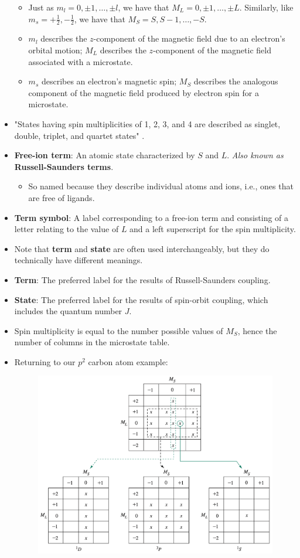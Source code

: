 \documentclass[../notes.tex]{subfiles}
\begin{document}
\begin{itemize}
\begin{itemize}
        \item Just as $m_l=0,\pm 1,\dots,\pm l$, we have that $M_L=0,\pm 1,\dots,\pm L$. Similarly, like $m_s=+\frac{1}{2},-\frac{1}{2}$, we have that $M_S=S,S-1,\dots,-S$.
        \item $m_l$ describes the $z$-component of the magnetic field due to an electron's orbital motion; $M_L$ describes the $z$-component of the magnetic field associated with a microstate.
        \item $m_s$ describes an electron's magnetic spin; $M_S$ describes the analogous component of the magnetic field produced by electron spin for a microstate.
    \end{itemize}
    \item "States having spin multiplicities of 1, 2, 3, and 4 are described as singlet, double, triplet, and quartet states" \parencite[408]{bib:MiesslerFischerTarr}.
    \item \textbf{Free-ion term}: An atomic state characterized by $S$ and $L$. \emph{Also known as} \textbf{Russell-Saunders terms}.
    \begin{itemize}
        \item So named because they describe individual atoms and ions, i.e., ones that are free of ligands.
    \end{itemize}
    \item \textbf{Term symbol}: A label corresponding to a free-ion term and consisting of a letter relating to the value of $L$ and a left superscript for the spin multiplicity.
    \item Note that \textbf{term} and \textbf{state} are often used interchangeably, but they do technically have different meanings.
    \item \textbf{Term}: The preferred label for the results of Russell-Saunders coupling.
    \item \textbf{State}: The preferred label for the results of spin-orbit coupling, which includes the quantum number $J$.
    \item Spin multiplicity is equal to the number possible values of $M_S$, hence the number of columns in the microstate table.
    \item Returning to our $p^2$ carbon atom example:
    \begin{figure}[h!]
        \centering
        \includegraphics[width=0.8\linewidth]{../ExtFiles/microstateTable-p2-reduced.png}

\end{figure}
\end{itemize}
\end{document}
